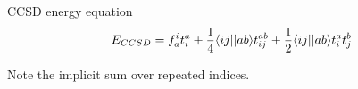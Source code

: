 \begin{frame}{CCSD energy equation }
    \begin{equation*}
    E_{CCSD} = 
    f_a^i t_i^a + \frac{1}{4} \langle ij||ab\rangle t_{ij}^{ab} + \frac{1}{2} \langle ij||ab\rangle  t_i^a  t_j^b
\end{equation*}

Note the implicit sum over repeated indices.



\end{frame}

    
